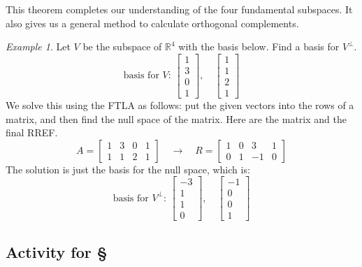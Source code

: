 \documentclass[11pt,oneside]{amsbook}
\newcommand{\R}{\mathbb R}
\theoremstyle{definition}
\theoremstyle{plain}
\theoremstyle{definition}
\theoremstyle{remark}
\newtheorem{example}[theorem]{Example}
\numberwithin{equation}{section}
\numberwithin{figure}{section}
\begin{document}
This theorem completes our understanding of the four fundamental subspaces. It also gives us a general method to calculate orthogonal complements.

\begin{example}
  Let $V$ be the subspace of $\R^4$ with the basis below. Find a basis for $V^\perp$.
  \[\text{basis for $V$: }\begin{bmatrix}1\\3\\0\\1\end{bmatrix},\quad
    \begin{bmatrix}1\\1\\2\\1\end{bmatrix}
  \]
  We solve this using the FTLA as follows: put the given vectors into the rows of a matrix, and then find the null space of the matrix. Here are the matrix and the final RREF.
  \[A=\begin{bmatrix}1&3&0&1\\1&1&2&1\end{bmatrix}\quad\rightarrow\quad
  R=\begin{bmatrix}1&0&3&1\\0&1&-1&0\end{bmatrix}
  \]
  The solution is just the basis for the null space, which is:
  \[\text{basis for $V^\perp$: }\begin{bmatrix}-3\\1\\1\\0\end{bmatrix},\quad
  \begin{bmatrix}-1\\0\\0\\1\end{bmatrix}
  \]
\end{example}

\newpage
\subsection*{Activity for \S \thesection}
\end{document}
